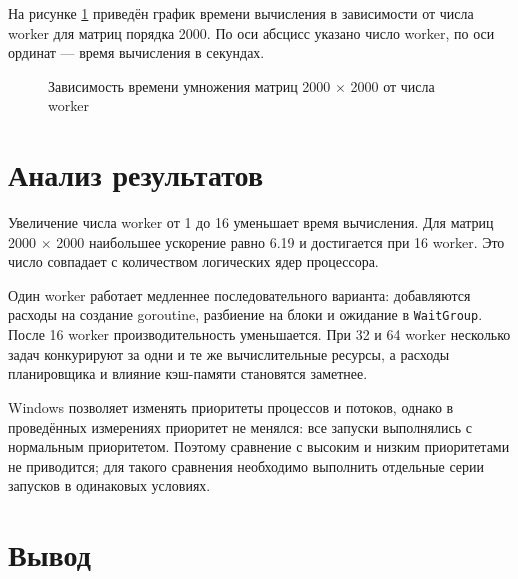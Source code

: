 \documentclass[a4paper,14pt]{extarticle}
\begin{document}
На рисунке \ref{fig:time2000} приведён график времени вычисления в зависимости
от числа worker для матриц порядка 2000. По оси абсцисс указано число worker,
по оси ординат --- время вычисления в секундах.

\begin{figure}[ht]
\centering
{}
\caption{Зависимость времени умножения матриц 2000 \texorpdfstring{$\times$}{x} 2000 от числа worker}
\label{fig:time2000}
\end{figure}

\section{Анализ результатов}

Увеличение числа worker от 1 до 16 уменьшает время вычисления. Для матриц
2000 \texorpdfstring{$\times$}{x} 2000 наибольшее ускорение равно 6.19 и
достигается при 16 worker. Это число совпадает с количеством логических ядер
процессора.

Один worker работает медленнее последовательного варианта: добавляются расходы
на создание goroutine, разбиение на блоки и ожидание в \texttt{WaitGroup}.
После 16 worker производительность уменьшается. При 32 и 64 worker несколько
задач конкурируют за одни и те же вычислительные ресурсы, а расходы планировщика
и влияние кэш-памяти становятся заметнее.

Windows позволяет изменять приоритеты процессов и потоков, однако в проведённых
измерениях приоритет не менялся: все запуски выполнялись с нормальным
приоритетом. Поэтому сравнение с высоким и низким приоритетами не приводится;
для такого сравнения необходимо выполнить отдельные серии запусков в одинаковых
условиях.

\section{Вывод}
\end{document}
